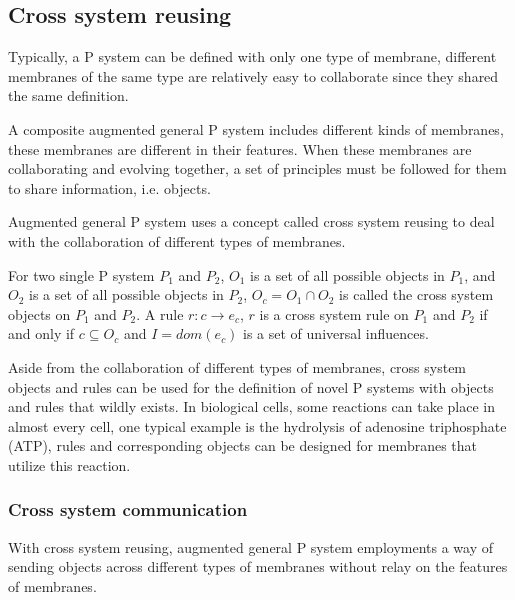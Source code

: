 \documentclass[9pt,a4paper,twoside]{article}
\begin{document}
        \subsection{Cross system reusing}
            Typically, a P system can be defined with only one type of membrane, different membranes of the same type are relatively easy to collaborate since they shared the same definition.
    
            A composite augmented general P system includes different kinds of membranes, these membranes are different in their features. When these membranes are collaborating and evolving together, a set of principles must be followed for them to share information, i.e. objects.
    
            Augmented general P system uses a concept called cross system reusing to deal with the collaboration of different types of membranes. 
    
            For two single P system $P_1$ and $P_2$, $O_1$ is a set of all possible objects in $P_1$, and $O_2$ is a set of all possible objects in $P_2$, $O_c = O_1 \cap O_2$ is called the cross system objects on $P_1$ and $P_2$. A rule $r: c \rightarrow e_c$, $r$ is a cross system rule on $P_1$ and $P_2$ if and only if $c \subseteq O_c$ and $I = dom(e_c)$ is a set of universal influences.
    
            Aside from the collaboration of different types of membranes, cross system objects and rules can be used for the definition of novel P systems with objects and rules that wildly exists. In biological cells, some reactions can take place in almost every cell, one typical example is the hydrolysis of adenosine triphosphate (ATP), rules and corresponding objects can be designed for membranes that utilize this reaction.
        
        \subsubsection{Cross system communication}
            With cross system reusing, augmented general P system employments a way of sending objects across different types of membranes without relay on the features of membranes.
\end{document}
